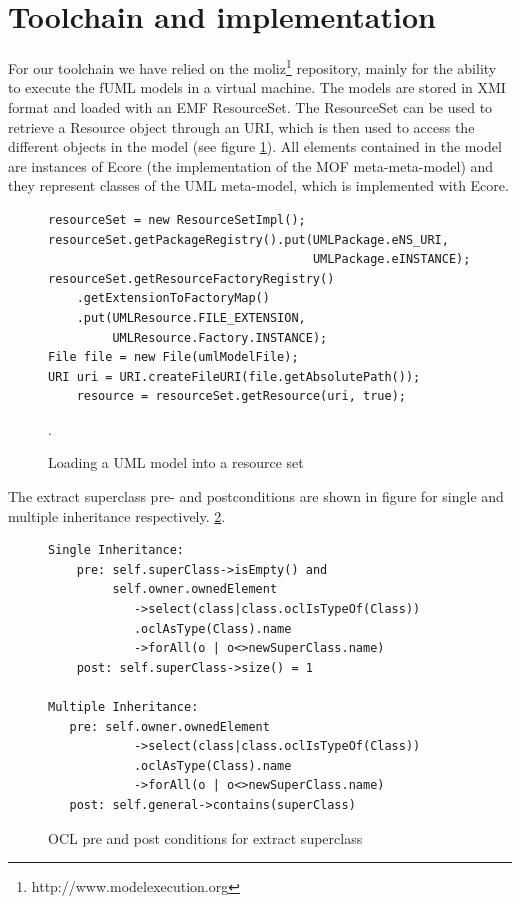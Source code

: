 \documentclass{llncs}
\begin{document}
\section{Toolchain and implementation}
\label{sec:toolchain}
For our toolchain we have relied on the moliz\footnote{http://www.modelexecution.org} repository, mainly for the ability to execute the fUML 
models in a virtual machine. The models are stored in XMI format and loaded with an EMF ResourceSet. The ResourceSet
can be used to retrieve a Resource object through an URI, which is then used to access the different objects in the model 
(see figure \ref{lst:resourceset}). All elements contained in the model are instances of Ecore (the implementation of
the MOF meta-meta-model) and they represent classes of the UML meta-model, which is implemented with Ecore.

\begin{figure}
 \begin{lstlisting}
resourceSet = new ResourceSetImpl();
resourceSet.getPackageRegistry().put(UMLPackage.eNS_URI,
                                     UMLPackage.eINSTANCE);
resourceSet.getResourceFactoryRegistry()
    .getExtensionToFactoryMap()
    .put(UMLResource.FILE_EXTENSION,
         UMLResource.Factory.INSTANCE);
File file = new File(umlModelFile);
URI uri = URI.createFileURI(file.getAbsolutePath());
    resource = resourceSet.getResource(uri, true);
 \end{lstlisting}
 \caption{Loading a UML model into a resource set}.
 \label{lst:resourceset}
\end{figure}

The extract superclass pre- and postconditions are shown in figure for single and multiple inheritance respectively.
\ref{lst:oclsuperclass}.

\begin{figure}[h!t]
 \begin{lstlisting}
Single Inheritance:
    pre: self.superClass->isEmpty() and 
         self.owner.ownedElement
            ->select(class|class.oclIsTypeOf(Class))
            .oclAsType(Class).name
            ->forAll(o | o<>newSuperClass.name)
    post: self.superClass->size() = 1

Multiple Inheritance:
   pre: self.owner.ownedElement
            ->select(class|class.oclIsTypeOf(Class))
            .oclAsType(Class).name
            ->forAll(o | o<>newSuperClass.name)
   post: self.general->contains(superClass)
 \end{lstlisting}
 \caption{OCL pre and post conditions for extract superclass}
 \label{lst:oclsuperclass}
\end{figure}
\end{document}

